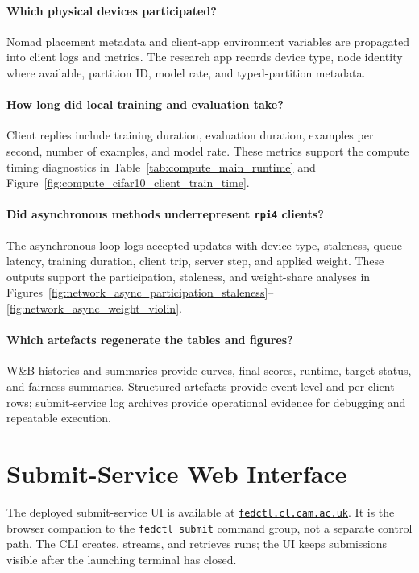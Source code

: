 \paragraph{Which physical devices participated?}
Nomad placement metadata and client-app environment variables are propagated into client logs and metrics. The research app records device type, node identity where available, partition ID, model rate, and typed-partition metadata.

\paragraph{How long did local training and evaluation take?}
Client replies include training duration, evaluation duration, examples per second, number of examples, and model rate. These metrics support the compute timing diagnostics in Table~\ref{tab:compute_main_runtime} and Figure~\ref{fig:compute_cifar10_client_train_time}.

\paragraph{Did asynchronous methods underrepresent \texttt{rpi4} clients?}
The asynchronous loop logs accepted updates with device type, staleness, queue latency, training duration, client trip, server step, and applied weight. These outputs support the participation, staleness, and weight-share analyses in Figures~\ref{fig:network_async_participation_staleness}--\ref{fig:network_async_weight_violin}.

\paragraph{Which artefacts regenerate the tables and figures?}
W\&B histories and summaries provide curves, final scores, runtime, target status, and fairness summaries. Structured artefacts provide event-level and per-client rows; submit-service log archives provide operational evidence for debugging and repeatable execution.

\section{Submit-Service Web Interface}
\label{appendix:submit_service_web_interface}

The deployed submit-service UI is available at \href{http://fedctl.cl.cam.ac.uk}{\texttt{fedctl.cl.cam.ac.uk}}. It is the browser companion to the \texttt{fedctl submit} command group, not a separate control path. The CLI creates, streams, and retrieves runs; the UI keeps submissions visible after the launching terminal has closed.

